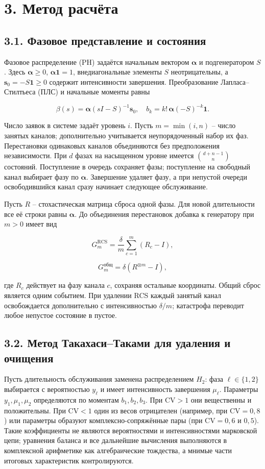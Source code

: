 \section*{3. Метод расчёта}
\subsection*{3.1. Фазовое представление и состояния}
Фазовое распределение (PH) задаётся начальным вектором \(\boldsymbol\alpha\) и подгенератором \(S\). Здесь \(\boldsymbol\alpha\ge0\), \(\boldsymbol\alpha\mathbf1=1\), внедиагональные элементы \(S\) неотрицательны, а \(\boldsymbol s_0=-S\mathbf1\ge0\) содержит интенсивности завершения. Преобразование Лапласа--Стилтьеса (ПЛС) и начальные моменты равны


\[\beta(s)=\boldsymbol\alpha(sI-S)^{-1}\boldsymbol s_0,\quad
b_k=k!\,\boldsymbol\alpha(-S)^{-k}\mathbf1.\]


Число заявок в системе задаёт уровень \(i\). Пусть \(m=\min(i,n)\) -- число занятых каналов; дополнительно учитывается неупорядоченный набор их фаз. Перестановки одинаковых каналов объединяются без предположения независимости. При \(d\) фазах на насыщенном уровне имеется \(\binom{d+n-1}{n}\) состояний. Поступление в очередь сохраняет фазы; поступление на свободный канал выбирает фазу по \(\boldsymbol\alpha\). Завершение удаляет фазу, а при непустой очереди освободившийся канал сразу начинает следующее обслуживание.

Пусть \(R\) -- стохастическая матрица сброса одной фазы. Для новой длительности все её строки равны \(\boldsymbol\alpha\). До объединения перестановок добавка к генератору при \(m>0\) имеет вид


\[G_m^{\mathrm{RCS}}=\frac{\delta}{m}\sum_{c=1}^{m}(R_c-I),\]

\[G_m^{\text{общ}}=\delta(R^{\otimes m}-I),\]


где \(R_c\) действует на фазу канала \(c\), сохраняя остальные координаты. Общий сброс является одним событием. При удалении RCS каждый занятый канал освобождается дополнительно с интенсивностью \(\delta/m\); катастрофа переводит любое непустое состояние в пустое.

\subsection*{3.2. Метод Такахаси--Таками для удаления и очищения}
Пусть длительность обслуживания заменена распределением \(H_2\): фаза \(\ell\in\{1,2\}\) выбирается с вероятностью \(y_\ell\) и имеет интенсивность завершения \(\mu_\ell\). Параметры \(y_1,\mu_1,\mu_2\) определяются по моментам \(b_1,b_2,b_3\). При \(\mathrm{CV}>1\) они вещественны и положительны. При \(\mathrm{CV}<1\) один из весов отрицателен (например, при \(\mathrm{CV}=0{,}8\)) или параметры образуют комплексно-сопряжённые пары (при \(\mathrm{CV}=0{,}6\) и \(0{,}5\)). Такие коэффициенты не являются вероятностями и интенсивностями марковской цепи; уравнения баланса и все дальнейшие вычисления выполняются в комплексной арифметике как алгебраические тождества, а мнимые части итоговых характеристик контролируются.

